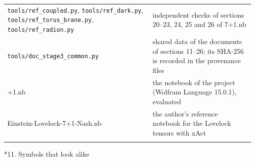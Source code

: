 \documentclass[10pt,a4paper]{article}
\makeatletter
\renewcommand\section{\@startsection{section}{1}{\z@}{-3.5ex \@plus -1ex \@minus -.2ex}{2.3ex \@plus.2ex}{\normalfont\Large\bfseries\raggedright}}
\makeatother
\begin{document}
{\begin{longtable}{>{\raggedright\arraybackslash}p{}>{\raggedright\arraybackslash}p{}}
\texttt{tools/\allowbreak{}ref\_\allowbreak{}coupled.py}, \texttt{tools/\allowbreak{}ref\_\allowbreak{}dark.py}, \texttt{tools/\allowbreak{}ref\_\allowbreak{}torus\_\allowbreak{}brane.py}, \texttt{tools/\allowbreak{}ref\_\allowbreak{}radion.py} & independent checks of sections 20–23, 24, 25 and 26 of 7+1.nb \\
\texttt{tools/\allowbreak{}doc\_\allowbreak{}stage3\_\allowbreak{}common.py} & shared data of the documents of sections 11–26; its SHA-256 is recorded in the provenance files \\
7+1.nb & the notebook of the project (Wolfram Language 15.0.1), evaluated \\
Einstein-Lovelock-7+1-Nash.nb & the author’s reference notebook for the Lovelock tensors with xAct \\*
\end{longtable}}
\section*{11. Symbols that look alike}
\end{document}
